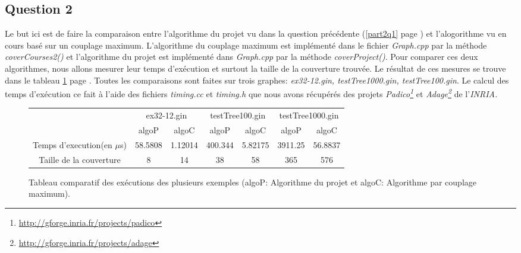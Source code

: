   \subsection{Question 2}
  Le but ici est de faire la comparaison entre l'algorithme du projet vu
  dans la question précédente (\ref{part2q1} page \pageref{part2q1}) et
  l'alogorithme vu en cours basé sur un couplage maximum.\newline
  \indent L'algorithme du couplage maximum est implémenté dans le fichier
  \emph{Graph.cpp} par la méthode \emph{coverCourses2()} et l'algorithme
  du projet est implémenté dans \emph{Graph.cpp} par la méthode
  \emph{coverProject()}.\newline
  \indent Pour comparer ces deux algorithmes, nous allons mesurer leur
  temps d'exécution et surtout la taille de la couverture trouvée. Le
  résultat de ces mesures se trouve dans le tableau \ref{tableau}
  page \pageref{tableau}. Toutes les comparaisons sont faites sur trois
  graphes: \emph{ex32-12.gin, testTree1000.gin, testTree100.gin}.\newline
  \indent Le calcul des temps d'exécution ce fait à l'aide des fichiers
  \emph{timing.cc} et \emph{timing.h} que nous avons récupérés des
  projets \emph{Padico\footnote{\url{http://gforge.inria.fr/projects/padico}}}
  et \emph{Adage\footnote{\url{http://gforge.inria.fr/projects/adage}}} de
  l'\emph{INRIA.}\newline

  \begin{figure}[!ht]
   \begin{center}
    \begin{tabular}{|c|c|c||c|c||c|c|}
     \cline{2-7}
     \multicolumn{1}{c|}{} & \multicolumn{2}{|c||}{ex32-12.gin}
     &\multicolumn{2}{|c||}{testTree100.gin} &
     \multicolumn{2}{|c|}{testTree1000.gin}\\ 
     \cline{2-7}
     \multicolumn{1}{c|}{} & algoP & algoC & algoP & algoC & algoP &
     algoC\\
     \hline
     Temps d'execution(en $\mu$s) & 58.5808 & 1.12014 & 400.344 &
     5.82175 & 3911.25 & 56.8837\\
     \hline
     Taille de la couverture & 8 & 14 & 38 & 58 & 365 & 576\\
     \hline
    \end{tabular}
    \caption{Tableau comparatif des exécutions des plusieurs
    exemples (algoP: Algorithme du projet et algoC: Algorithme par
    couplage maximum).\label{tableau}} 
   \end{center}
  \end{figure}  

